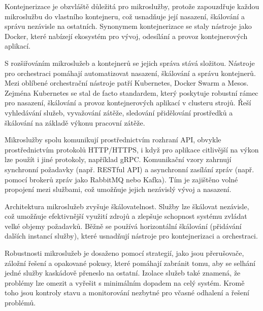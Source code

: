 Kontejnerizace je obzvláště důležitá pro mikroslužby, protože zapouzdřuje každou mikroslužbu do vlastního kontejneru, což usnadňuje její nasazení, škálování a správu nezávisle na ostatních. Synonymem kontejnerizace se staly nástroje jako Docker, které nabízejí ekosystém pro vývoj, odesílání a provoz kontejnerových aplikací.


S rozšiřováním mikroslužeb a kontejnerů se jejich správa stává složitou. Nástroje pro orchestraci pomáhají automatizovat nasazení, škálování a správu kontejnerů. Mezi oblíbené orchestrační nástroje patří Kubernetes, Docker Swarm a Mesos. Zejména Kubernetes se stal de facto standardem, který poskytuje robustní rámec pro nasazení, škálování a provoz kontejnerových aplikací v clusteru strojů. Řeší vyhledávání služeb, vyvažování zátěže, sledování přidělování prostředků a škálování na základě výkonu pracovní zátěže.



Mikroslužby spolu komunikují prostřednictvím rozhraní API, obvykle prostřednictvím protokolů HTTP/HTTPS, i když pro aplikace citlivější na výkon lze použít i jiné protokoly, například gRPC. Komunikační vzory zahrnují synchronní požadavky (např. RESTful API) a asynchronní zasílání zpráv (např. pomocí brokerů zpráv jako RabbitMQ nebo Kafka). Tím je zajištěno volné propojení mezi službami, což umožňuje jejich nezávislý vývoj a nasazení.





Architektura mikroslužeb zvyšuje škálovatelnost. Služby lze škálovat nezávisle, což umožňuje efektivnější využití zdrojů a zlepšuje schopnost systému zvládat velké objemy požadavků. Běžně se používá horizontální škálování (přidávání dalších instancí služby), které usnadňují nástroje pro kontejnerizaci a orchestraci.


Robustnosti mikroslužeb je dosaženo pomocí strategií, jako jsou přerušovače, záložní řešení a opakované pokusy, které pomáhají zabránit tomu, aby se selhání jedné služby kaskádově přeneslo na ostatní. Izolace služeb také znamená, že problémy lze omezit a vyřešit s minimálním dopadem na celý systém. Kromě toho jsou kontroly stavu a monitorování nezbytné pro včasné odhalení a řešení problémů.

